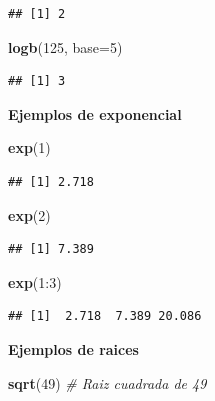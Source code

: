 \documentclass[10pt,]{krantz}
\makeatletter
\newenvironment{Shaded}{\begin{snugshade}}{\end{snugshade}}
\newcommand{\KeywordTok}[1]{\textcolor[rgb]{0.13,0.29,0.53}{\textbf{{#1}}}}
\newcommand{\DataTypeTok}[1]{\textcolor[rgb]{0.13,0.29,0.53}{{#1}}}
\newcommand{\DecValTok}[1]{\textcolor[rgb]{0.00,0.00,0.81}{{#1}}}
\newcommand{\CommentTok}[1]{\textcolor[rgb]{0.56,0.35,0.01}{\textit{{#1}}}}
\newcommand{\NormalTok}[1]{{#1}}
\newenvironment{kframe}{%
\medskip{}
\setlength{\fboxsep}{.8em}
 \def\at@end@of@kframe{}%
 \ifinner\ifhmode%
  \def\at@end@of@kframe{\end{minipage}}%
  \begin{minipage}{\columnwidth}%
 \fi\fi%
 \def\FrameCommand##1{\hskip\@totalleftmargin \hskip-\fboxsep
 \colorbox{shadecolor}{##1}\hskip-\fboxsep
     \hskip-\linewidth \hskip-\@totalleftmargin \hskip\columnwidth}%
 \MakeFramed {\advance\hsize-\width
   \@totalleftmargin\z@ \linewidth\hsize
   \@setminipage}}%
 {\par\unskip\endMakeFramed%
 \at@end@of@kframe}
\renewenvironment{Shaded}{\begin{kframe}}{\end{kframe}}
\makeatother
\begin{document}
\begin{verbatim}
## [1] 2
\end{verbatim}

\begin{Shaded}
\begin{Highlighting}[]
\KeywordTok{logb}\NormalTok{(}\DecValTok{125}\NormalTok{, }\DataTypeTok{base=}\DecValTok{5}\NormalTok{)}
\end{Highlighting}
\end{Shaded}

\begin{verbatim}
## [1] 3
\end{verbatim}

\textbf{Ejemplos de exponencial}

\begin{Shaded}
\begin{Highlighting}[]
\KeywordTok{exp}\NormalTok{(}\DecValTok{1}\NormalTok{)}
\end{Highlighting}
\end{Shaded}

\begin{verbatim}
## [1] 2.718
\end{verbatim}

\begin{Shaded}
\begin{Highlighting}[]
\KeywordTok{exp}\NormalTok{(}\DecValTok{2}\NormalTok{)}
\end{Highlighting}
\end{Shaded}

\begin{verbatim}
## [1] 7.389
\end{verbatim}

\begin{Shaded}
\begin{Highlighting}[]
\KeywordTok{exp}\NormalTok{(}\DecValTok{1}\NormalTok{:}\DecValTok{3}\NormalTok{)}
\end{Highlighting}
\end{Shaded}

\begin{verbatim}
## [1]  2.718  7.389 20.086
\end{verbatim}

\textbf{Ejemplos de raices}

\begin{Shaded}
\begin{Highlighting}[]
\KeywordTok{sqrt}\NormalTok{(}\DecValTok{49}\NormalTok{)  }\CommentTok{# Raiz cuadrada de 49}
\end{Highlighting}
\end{Shaded}
\end{document}
